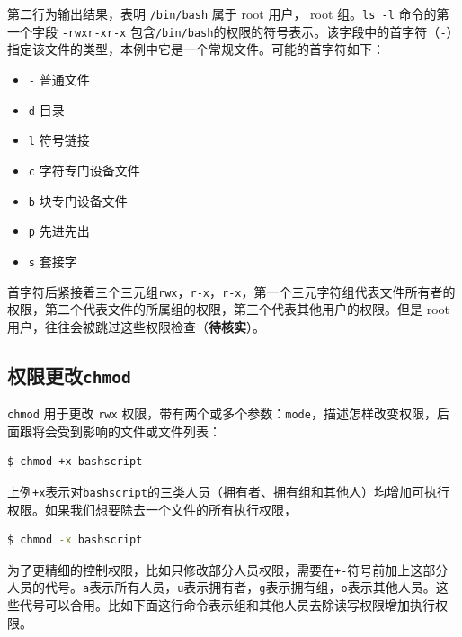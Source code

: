 \documentclass[doctor,openright,twoside]{sjtuthesis}
\providecommand{\tightlist}{%
    \setlength{\itemsep}{0pt}\setlength{\parskip}{0pt}}
\newcommand{\passthrough}[1]{#1}
\theoremstyle{plain}
\theoremstyle{definition}
\theoremstyle{remark}
\theoremstyle{ocrenumbox}
\theoremstyle{plain}
\begin{document}
第二行为输出结果，表明 \passthrough{\lstinline!/bin/bash!} 属于 root 用户， root 组。\passthrough{\lstinline!ls -l!} 命令的第一个字段 \passthrough{\lstinline!-rwxr-xr-x!} 包含\passthrough{\lstinline!/bin/bash!}的权限的符号表示。该字段中的首字符（\passthrough{\lstinline!-!}）指定该文件的类型，本例中它是一个常规文件。可能的首字符如下：

\begin{itemize}
\tightlist
\item
  \passthrough{\lstinline!-!} 普通文件
\item
  \passthrough{\lstinline!d!} 目录
\item
  \passthrough{\lstinline!l!} 符号链接
\item
  \passthrough{\lstinline!c!} 字符专门设备文件
\item
  \passthrough{\lstinline!b!} 块专门设备文件
\item
  \passthrough{\lstinline!p!} 先进先出
\item
  \passthrough{\lstinline!s!} 套接字
\end{itemize}

首字符后紧接着三个三元组\passthrough{\lstinline!rwx!}，\passthrough{\lstinline!r-x!}，\passthrough{\lstinline!r-x!}，第一个三元字符组代表文件所有者的权限，第二个代表文件的所属组的权限，第三个代表其他用户的权限。但是 root 用户，往往会被跳过这些权限检查（\textbf{待核实}）。

\hypertarget{chmod}{%
\subsection{\texorpdfstring{权限更改\texttt{chmod}}{权限更改chmod}}\label{chmod}}

\passthrough{\lstinline!chmod!} 用于更改 \passthrough{\lstinline!rwx!} 权限，带有两个或多个参数：\passthrough{\lstinline!mode!}，描述怎样改变权限，后面跟将会受到影响的文件或文件列表：

\begin{lstlisting}[language=bash]
$ chmod +x bashscript
\end{lstlisting}

上例\passthrough{\lstinline!+x!}表示对\passthrough{\lstinline!bashscript!}的三类人员（拥有者、拥有组和其他人）均增加可执行权限。如果我们想要除去一个文件的所有执行权限，

\begin{lstlisting}[language=bash]
$ chmod -x bashscript
\end{lstlisting}

为了更精细的控制权限，比如只修改部分人员权限，需要在\passthrough{\lstinline!+-!}符号前加上这部分人员的代号。\passthrough{\lstinline!a!}表示所有人员，\passthrough{\lstinline!u!}表示拥有者，\passthrough{\lstinline!g!}表示拥有组，\passthrough{\lstinline!o!}表示其他人员。这些代号可以合用。比如下面这行命令表示组和其他人员去除读写权限增加执行权限。
\end{document}
